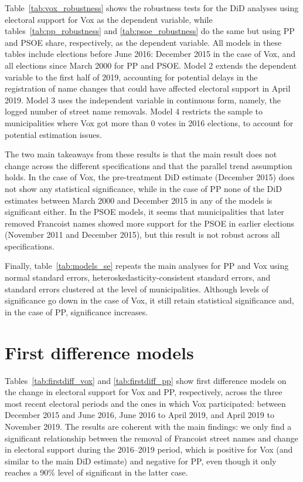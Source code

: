 \documentclass[12pt, titlepage]{article}
\begin{document}
Table~\ref{tab:vox_robustness} shows the robustness tests for the DiD analyses using electoral support for Vox as the dependent variable, while tables~\ref{tab:pp_robustness} and \ref{tab:psoe_robustness} do the same but using PP and PSOE share, respectively, as the dependent variable.
All models in these tables include elections before June 2016: December 2015 in the case of Vox, and all elections since March 2000 for PP and PSOE.
Model 2 extends the dependent variable to the first half of 2019, accounting for potential delays in the registration of name changes that could have affected electoral support in April 2019.
Model 3 uses the independent variable in continuous form, namely, the logged number of street name removals.
Model 4 restricts the sample to municipalities where Vox got more than 0 votes in 2016 elections, to account for potential estimation issues.

The two main takeaways from these results is that the main result does not change across the different specifications and that the parallel trend assumption holds.
In the case of Vox, the pre-treatment DiD estimate (December 2015) does not show any statistical significance, while in the case of PP none of the DiD estimates between March 2000 and December 2015 in any of the models is significant either.
In the PSOE models, it seems that municipalities that later removed Francoist names showed more support for the PSOE in earlier elections (November 2011 and December 2015), but this result is not robust across all specifications.

Finally, table~\ref{tab:models_se} repeats the main analyses for PP and Vox using normal standard errors, heteroskedasticity-consistent standard errors, and standard errors clustered at the level of municipalities.
Although levels of significance go down in the case of Vox, it still retain statistical significance and, in the case of PP, significance increases.







\clearpage
\section{First difference models}

Tables~\ref{tab:firstdiff_vox} and \ref{tab:firstdiff_pp} show first difference models on the change in electoral support for Vox and PP, respectively, across the three most recent electoral periods and the ones in which Vox participated: between December 2015 and June 2016, June 2016 to April 2019, and April 2019 to November 2019.
The results are coherent with the main findings: we only find a significant relationship between the removal of Francoist street names and change in electoral support during the 2016--2019 period, which is positive for Vox (and similar to the main DiD estimate) and negative for PP, even though it only reaches a 90\% level of significant in the latter case.



\end{document}

